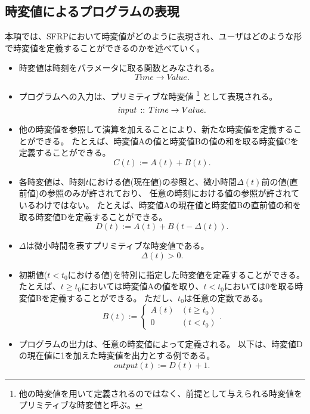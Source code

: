 \subsection{時変値によるプログラムの表現}\label{sec:language:model:program}
本項では、SFRPにおいて時変値がどのように表現され、ユーザはどのような形で時変値を定義することができるのかを述べていく。

\begin{itemize}
  \item
  時変値は時刻をパラメータに取る関数とみなされる。
  \begin{equation*}
    Time \rightarrow Value.
  \end{equation*}

  \item
  プログラムへの入力は、プリミティブな時変値
  \footnote{他の時変値を用いて定義されるのではなく、前提として与えられる時変値をプリミティブな時変値と呼ぶ。}
  として表現される。
  \begin{equation*}
    {\it input} \, :: \, Time \rightarrow Value.
  \end{equation*}

  \item
  他の時変値を参照して演算を加えることにより、新たな時変値を定義することができる。
  たとえば、時変値Aの値と時変値Bの値の和を取る時変値Cを定義することができる。
  \begin{equation*}
    C(t) := A(t) + B(t).
  \end{equation*}

  \item
  各時変値は、時刻$t$における値(現在値)の参照と、微小時間$ \Delta(t) $前の値(直前値)の参照のみが許されており、
  任意の時刻における値の参照が許されているわけではない。
  たとえば、時変値Aの現在値と時変値Bの直前値の和を取る時変値Dを定義することができる。
  \begin{equation*}
    D(t) := A(t) + B(t - \Delta(t)).
  \end{equation*}

  \item
  $ \Delta $は微小時間を表すプリミティブな時変値である。
  \begin{equation*}
    \Delta(t) > 0.
  \end{equation*}

  \item
  初期値($ t < t_0 $における値)を特別に指定した時変値を定義することができる。
  たとえば、$t \geq t_0$においては時変値Aの値を取り、$t < t_0$においては0を取る時変値Bを定義することができる。
  ただし、$t_0$は任意の定数である。
  \begin{equation*}
    B(t) := \begin{cases}
      A(t) & (t \geq t_0) \\
      0 & (t < t_0)
    \end{cases}.
  \end{equation*}

  \item
  プログラムの出力は、任意の時変値によって定義される。
  以下は、時変値Dの現在値に1を加えた時変値を出力とする例である。
  \begin{equation*}
    output(t) := D(t) + 1.
  \end{equation*}
\end{itemize}

